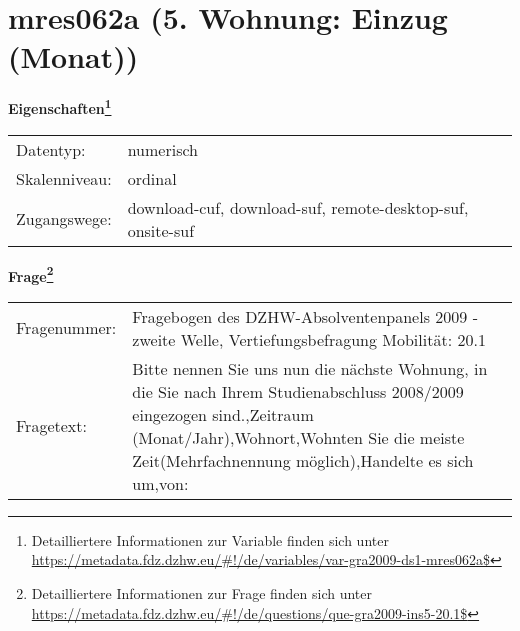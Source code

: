 
    \setcounter{footnote}{0}

    \vspace*{-1.8cm}
	\section{mres062a (5. Wohnung: Einzug (Monat))}
	\label{section:mres062a}



    \vspace*{0.5cm}
    \noindent\textbf{Eigenschaften\footnote{Detailliertere Informationen zur Variable finden sich unter
		\url{https://metadata.fdz.dzhw.eu/\#!/de/variables/var-gra2009-ds1-mres062a$}}}\\
	\begin{tabularx}{\hsize}{@{}lX}
	Datentyp: & numerisch \\
	Skalenniveau: & ordinal \\
	Zugangswege: &
	  download-cuf, 
	  download-suf, 
	  remote-desktop-suf, 
	  onsite-suf
 \\
    \end{tabularx}



				\vspace*{0.5cm}
                \noindent\textbf{Frage\footnote{Detailliertere Informationen zur Frage finden sich unter
		              \url{https://metadata.fdz.dzhw.eu/\#!/de/questions/que-gra2009-ins5-20.1$}}}\\
				\begin{tabularx}{\hsize}{@{}lX}
					Fragenummer: &
					  Fragebogen des DZHW-Absolventenpanels 2009 - zweite Welle, Vertiefungsbefragung Mobilität:
					  20.1
 \\
					Fragetext: & Bitte nennen Sie uns nun die nächste Wohnung, in die Sie nach Ihrem Studienabschluss 2008/2009 eingezogen sind.,Zeitraum (Monat/Jahr),Wohnort,Wohnten Sie die meiste Zeit(Mehrfachnennung möglich),Handelte es sich um,von: \\
				\end{tabularx}





